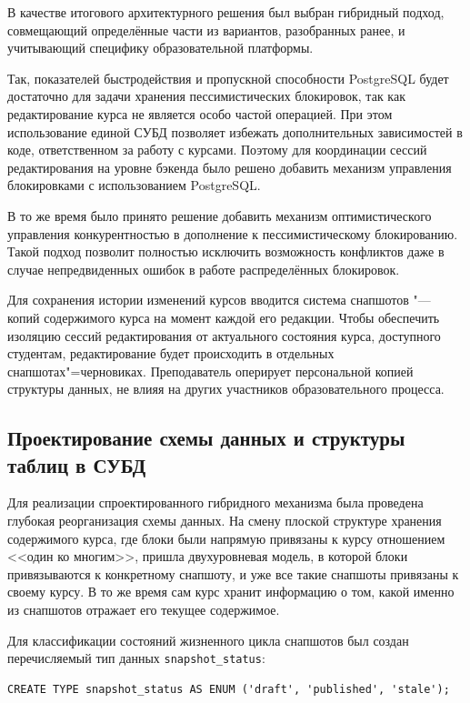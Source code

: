 \documentclass[coursework]{SCWorks}
\begin{document}
В качестве итогового архитектурного решения был выбран гибридный подход, совмещающий определённые части из вариантов, разобранных ранее, и учитывающий специфику образовательной платформы.

Так, показателей быстродействия и пропускной способности PostgreSQL будет достаточно для задачи хранения пессимистических блокировок, так как редактирование курса не является особо частой операцией. При этом использование единой СУБД позволяет избежать дополнительных зависимостей в коде, ответственном за работу с курсами. Поэтому для координации сессий редактирования на уровне бэкенда было решено добавить механизм управления блокировками с использованием PostgreSQL.

В то же время было принято решение добавить механизм оптимистического управления конкурентностью в дополнение к пессимистическому блокированию. Такой подход позволит полностью исключить возможность конфликтов даже в случае непредвиденных ошибок в работе распределённых блокировок.

Для сохранения истории изменений курсов вводится система снапшотов "--- копий содержимого курса на момент каждой его редакции. Чтобы обеспечить изоляцию сессий редактирования от актуального состояния курса, доступного студентам, редактирование будет происходить в отдельных снапшотах"=черновиках. Преподаватель оперирует персональной копией структуры данных, не влияя на других участников образовательного процесса.

\subsection{Проектирование схемы данных и структуры таблиц в СУБД}

Для реализации спроектированного гибридного механизма была проведена глубокая реорганизация схемы данных. На смену плоской структуре хранения содержимого курса, где блоки были напрямую привязаны к курсу отношением <<один ко многим>>, пришла двухуровневая модель, в которой блоки привязываются к конкретному снапшоту, и уже все такие снапшоты привязаны к своему курсу. В то же время сам курс хранит информацию о том, какой именно из снапшотов отражает его текущее содержимое.

Для классификации состояний жизненного цикла снапшотов был создан перечисляемый тип данных \texttt{snapshot\_status}:

\begin{verbatim}
CREATE TYPE snapshot_status AS ENUM ('draft', 'published', 'stale');
\end{verbatim}
\end{document}
